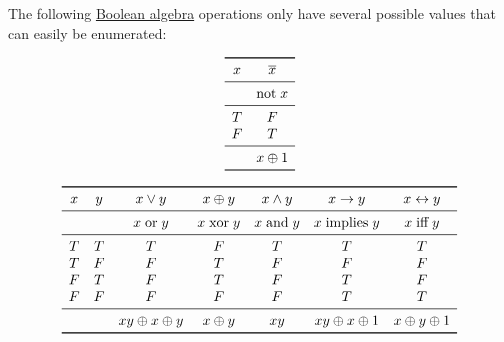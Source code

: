 \begin{proposition}\label{thm:standard_boolean_functions}
  The following \hyperref[def:boolean_algebra]{Boolean algebra} operations only have several possible values that can easily be enumerated:
  \begin{paracol}{2}
    \begin{leftcolumn}
      \begin{equation*}
        \begin{array}{*{2}{c}}
          \toprule
          x & \oline{x}  \\
          \midrule
            & \T{not} x  \\
          \midrule
          T & F          \\
          F & T          \\
          \midrule
            & x \oplus 1 \\
          \bottomrule
        \end{array}
      \end{equation*}
    \end{leftcolumn}

    \begin{rightcolumn}
      \begin{equation*}
        \begin{array}{*{7}{c}}
          \toprule
          x & y & x \vee y             & x \oplus y  & x \wedge y  & x \rightarrow y      & x \leftrightarrow y \\
          \midrule
            &   & x \T{or} y           & x \T{xor} y & x \T{and} y & x \T{implies} y      & x \T{iff} y         \\
          \midrule
          T & T & T                    & F           & T           & T                    & T                   \\
          T & F & F                    & T           & F           & F                    & F                   \\
          F & T & F                    & T           & F           & T                    & F                   \\
          F & F & F                    & F           & F           & T                    & T                   \\
          \midrule
            &   & xy \oplus x \oplus y & x \oplus y  & xy          & xy \oplus x \oplus 1 & x \oplus y \oplus 1 \\
          \bottomrule
        \end{array}
      \end{equation*}
    \end{rightcolumn}
  \end{paracol}
  \columnratio{}
\end{proposition}
